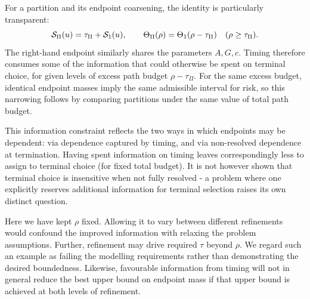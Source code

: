 For a partition and its endpoint coarsening, the identity is particularly transparent:
\begin{equation}\label{eq:effectivebudget}
 \mathcal S_\Pi(u)=\tau_\Pi+\mathcal S_1(u),\qquad
 \Theta_\Pi(\rho)=\Theta_1(\rho-\tau_\Pi)\quad(\rho\ge\tau_\Pi).
\end{equation}
The right-hand endpoint similarly shares the parameters $A,G,c$. Timing therefore consumes some of the information that could otherwise be spent on terminal choice, for given levels of excess path budget $\rho - \tau_\Pi$. For the same excess budget, identical endpoint masses imply the same admissible interval for risk, so this narrowing follows by comparing partitions under the same value of total path budget.

This information constraint reflects the two ways in which endpoints may be dependent: via dependence captured by timing, and via non-resolved dependence at termination. Having spent information on timing leaves correspondingly less to assign to terminal choice (for fixed total budget). It is not however shown that terminal choice is insensitive when not fully resolved - a problem where one explicitly reserves additional information for terminal selection raises its own distinct question.

Here we have kept $\rho$ fixed. Allowing it to vary between different refinements would confound the improved information with relaxing the problem assumptions. Further, refinement may drive required $\tau$ beyond $\rho$. We regard such an example as failing the modelling requirements rather than demonstrating the desired boundedness. Likewise, favourable information from timing will not in general reduce the best upper bound on endpoint mass if that upper bound is achieved at both levels of refinement.

